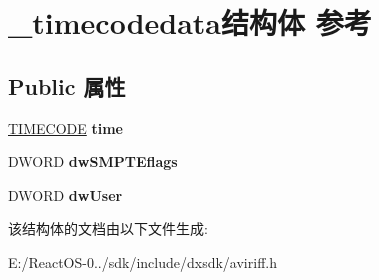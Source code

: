\hypertarget{struct__timecodedata}{}\section{\+\_\+timecodedata结构体 参考}
\label{struct__timecodedata}
\subsection*{Public 属性}
\begin{DoxyCompactItemize}
\item 
\mbox{\label{struct__timecodedata_a260fc8c9b1e95e5691be386209e5453f}} 
\hyperlink{union__timecode}{T\+I\+M\+E\+C\+O\+DE} {\bfseries time}
\item 
\mbox{\label{struct__timecodedata_a1c3954f2332dd70d187be88bae90e924}} 
D\+W\+O\+RD {\bfseries dw\+S\+M\+P\+T\+Eflags}
\item 
\mbox{\label{struct__timecodedata_a88dad29994906e07b84b982b9e4aa56b}} 
D\+W\+O\+RD {\bfseries dw\+User}
\end{DoxyCompactItemize}


该结构体的文档由以下文件生成\+:\begin{DoxyCompactItemize}
\item 
E\+:/\+React\+O\+S-\/0../sdk/include/dxsdk/aviriff.\+h\end{DoxyCompactItemize}
